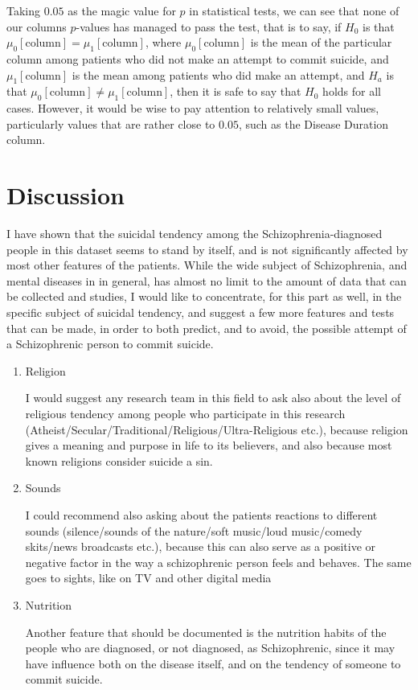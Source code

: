 \documentclass{article}
\begin{document}
Taking $0.05$ as the magic value for $p$ in statistical tests, we can see that none of our columns $p$-values has managed to pass the test, that is to say, if $H_0$ is that $\mu_0[\text{column}]=\mu_1[\text{column}]$, where $\mu_0[\text{column}]$ is the mean of the particular column among patients who did not make an attempt to commit suicide, and $\mu_1[\text{column}]$ is the mean among patients who did make an attempt, and $H_a$ is that $\mu_0[\text{column}]\neq\mu_1[\text{column}]$, then it is safe to say that $H_0$ holds for all cases. However, it would be wise to pay attention to relatively small values, particularly values that are rather close to $0.05$, such as the Disease Duration column.

\section{Discussion}
I have shown that the suicidal tendency among the Schizophrenia-diagnosed people in this dataset seems to stand by itself, and is not significantly affected by most other features of the patients. While the wide subject of Schizophrenia, and mental diseases in in general, has almost no limit to the amount of data that can be collected and studies, I would like to concentrate, for this part as well, in the specific subject of suicidal tendency, and suggest a few more features and tests that can be made, in order to both predict, and to avoid, the possible attempt of a Schizophrenic person to commit suicide.
\begin{enumerate}
    \item Religion

    I would suggest any research team in this field to ask also about the level of religious tendency among people who participate in this research (Atheist/Secular/Traditional/Religious/Ultra-Religious etc.), because religion gives a meaning and purpose in life to its believers, and also because most known religions consider suicide a sin.

    \item Sounds

    I could recommend also asking about the patients reactions to different sounds (silence/sounds of the nature/soft music/loud music/comedy skits/news broadcasts etc.), because this can also serve as a positive or negative factor in the way a schizophrenic person feels and behaves. The same goes to sights, like on TV and other digital media

    \item Nutrition

    Another feature that should be documented is the nutrition habits of the people who are diagnosed, or not diagnosed, as Schizophrenic, since it may have influence both on the disease itself, and on the tendency of someone to commit suicide.
\end{enumerate}
\end{document}
